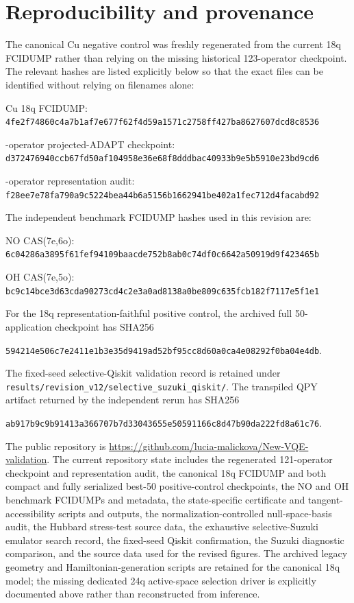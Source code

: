 \documentclass[
 aip,
 jcp,
 amsmath,amssymb,
 preprint
]{revtex4-2}
\begin{document}
\section{Reproducibility and provenance}

The canonical Cu negative control was freshly regenerated from the current 18q FCIDUMP rather than relying on the missing historical 123-operator checkpoint.
The relevant hashes are listed explicitly below so that the exact files can be identified without relying on filenames alone:

\noindent Cu 18q FCIDUMP:\\
{\small\texttt{4fe2f74860c4a7b1af7e677f62f4d59a1571c2758ff427ba8627607dcd8c8536}}

-operator projected-ADAPT checkpoint:\\
{\small\texttt{d372476940ccb67fd50af104958e36e68f8dddbac40933b9e5b5910e23bd9cd6}}

-operator representation audit:\\
{\small\texttt{f28ee7e78fa790a9c5224bea44b6a5156b1662941be402a1fec712d4facabd92}}

The independent benchmark FCIDUMP hashes used in this revision are:

\noindent NO CAS(7e,6o):\\
{\small\texttt{6c04286a3895f61fef94109baacde752b8ab0c74df0c6642a50919d9f423465b}}

\noindent OH CAS(7e,5o):\\
{\small\texttt{bc9c14bce3d63cda90273cd4c2e3a0ad8138a0be809c635fcb182f7117e5f1e1}}

For the 18q representation-faithful positive control, the archived full 50-application checkpoint has SHA256
\begin{center}
{\small\texttt{594214e506c7e2411e1b3e35d9419ad52bf95cc8d60a0ca4e08292f0ba04e4db}.}
\end{center}
The fixed-seed selective-Qiskit validation record is retained under
\texttt{results/revision\_v12/selective\_suzuki\_qiskit/}.
The transpiled QPY artifact returned by the independent rerun has SHA256
\begin{center}
{\small\texttt{ab917b9c9b91413a366707b7d33043655e50591166c8d47b90da222fd8a61c76}.}
\end{center}

The public repository is
\url{https://github.com/lucia-malickova/New-VQE-validation}.
The current repository state includes the regenerated 121-operator checkpoint and representation audit, the canonical 18q FCIDUMP and both compact and fully serialized best-50 positive-control checkpoints, the NO and OH benchmark FCIDUMPs and metadata, the state-specific certificate and tangent-accessibility scripts and outputs, the normalization-controlled null-space-basis audit, the Hubbard stress-test source data, the exhaustive selective-Suzuki emulator search record, the fixed-seed Qiskit confirmation, the Suzuki diagnostic comparison, and the source data used for the revised figures.
The archived legacy geometry and Hamiltonian-generation scripts are retained for the canonical 18q model; the missing dedicated 24q active-space selection driver is explicitly documented above rather than reconstructed from inference.


\end{document}
